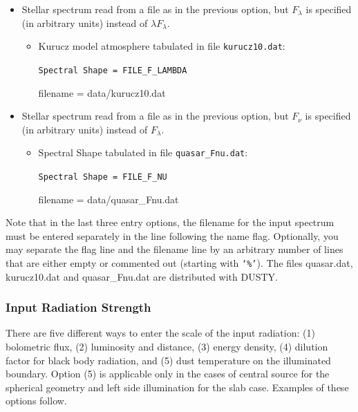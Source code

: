 \documentclass[11pt]{article}
\begin{document}
\begin{itemize}
\begin{itemize}
    {\tt Spectral Shape = FILE\_LAMBDA\_F\_LAMBDA

      filename = data/quasar.dat}
  \end{itemize}

\item Stellar spectrum read from a file as in the previous option, but
  $F_\lambda$ is specified (in arbitrary units) instead of $\lambda
  F_\lambda$.

  \begin{itemize}
  \item Kurucz model atmosphere tabulated in file {\tt kurucz10.dat}:

    {\tt Spectral Shape = FILE\_F\_LAMBDA

      filename = data/kurucz10.dat}
  \end{itemize}

\item Stellar spectrum read from a file as in the previous option, but
  $F_\nu$ is specified (in arbitrary units) instead of $F_\lambda$.

  \begin{itemize}
  \item Spectral Shape tabulated in file {\tt quasar\_Fnu.dat}:

    {\tt Spectral Shape = FILE\_F\_NU

      filename = data/quasar\_Fnu.dat}
  \end{itemize}

\end{itemize}

Note that in the last three entry options, the filename for the input
spectrum must be entered separately in the line following the name
flag. Optionally, you may separate the flag line and the filename line
by an arbitrary number of lines that are either empty or commented out
(starting with {\tt `\%'}). The files quasar.dat, kurucz10.dat and
quasar\_Fnu.dat are distributed with DUSTY.


\subsubsection{Input Radiation Strength}
\label{sec:scaling_radiation}

There are five different ways to enter the scale of the input
radiation: (1) bolometric flux, (2) luminosity and distance, (3)
energy density, (4) dilution factor for black body radiation, and (5)
dust temperature on the illuminated boundary. Option (5) is applicable
only in the cases of central source for the spherical geometry and
left side illumination for the slab case. Examples of these options
follow.
\end{document}
